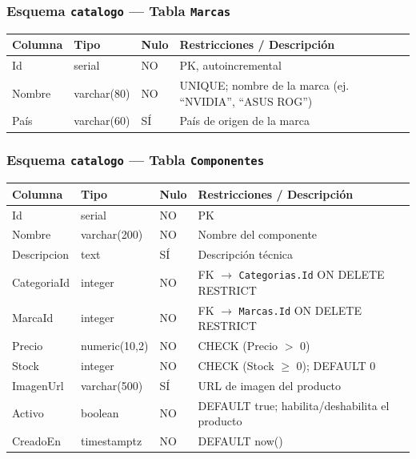 \subsubsection{Esquema \texttt{catalogo} --- Tabla \texttt{Marcas}}

\begin{center}
\begin{tablaAPA}
\begin{tabular}{L{2.8cm} L{2.0cm} C{1.4cm} L{7.0cm}}
\toprule
\textbf{Columna} & \textbf{Tipo} & \textbf{Nulo} & \textbf{Restricciones / Descripci\'on} \\
\midrule
Id      & serial      & NO & PK, autoincremental \\
Nombre  & varchar(80) & NO & UNIQUE; nombre de la marca (ej. ``NVIDIA'', ``ASUS ROG'') \\
Pa\'is   & varchar(60) & S\'I & Pa\'is de origen de la marca \\
\bottomrule
\end{tabular}
\end{tablaAPA}
\label{tab:dict-marcas}
\end{center}

\subsubsection{Esquema \texttt{catalogo} --- Tabla \texttt{Componentes}}

\begin{center}
\begin{tablaAPA}
\begin{tabular}{L{2.8cm} L{2.2cm} C{1.2cm} L{7.0cm}}
\toprule
\textbf{Columna} & \textbf{Tipo} & \textbf{Nulo} & \textbf{Restricciones / Descripci\'on} \\
\midrule
Id          & serial         & NO & PK \\
Nombre      & varchar(200)   & NO & Nombre del componente \\
Descripcion & text           & S\'I & Descripci\'on t\'ecnica \\
CategoriaId & integer        & NO & FK $\to$ \texttt{Categorias.Id} ON DELETE RESTRICT \\
MarcaId     & integer        & NO & FK $\to$ \texttt{Marcas.Id} ON DELETE RESTRICT \\
Precio      & numeric(10,2)  & NO & CHECK (Precio $>$ 0) \\
Stock       & integer        & NO & CHECK (Stock $\geq$ 0); DEFAULT 0 \\
ImagenUrl   & varchar(500)   & S\'I & URL de imagen del producto \\
Activo      & boolean        & NO & DEFAULT true; habilita/deshabilita el producto \\
CreadoEn    & timestamptz    & NO & DEFAULT now() \\
\bottomrule
\end{tabular}
\end{tablaAPA}
\label{tab:dict-componentes}
\end{center}

